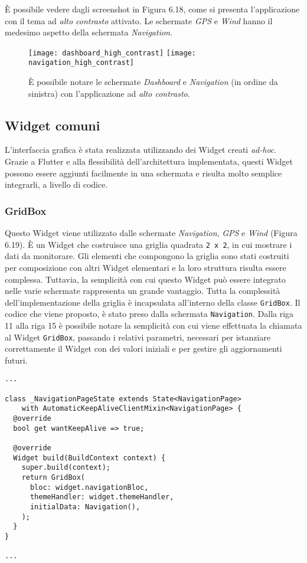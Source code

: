 È possibile vedere dagli screenshot in Figura 6.18, come si presenta l'applicazione con il tema ad \textit{alto contrasto} attivato. Le schermate \textit{GPS} e \textit{Wind} hanno il medesimo aspetto della schermata \textit{Navigation}.
\begin{figure}[htp]
	\centering
	\texttt{[image: dashboard\_high\_contrast]}
	\texttt{[image: navigation\_high\_contrast]}
	\caption[Screenshot - Dashboard e Navigation con tema ad alto contrasto]{È possibile notare le schermate \textit{Dashboard} e \textit{Navigation} (in ordine da sinistra) con l'applicazione ad \textit{alto contrasto}.}\label{xyz}
\end{figure}

\newpage

\subsection{Widget comuni}
L'interfaccia grafica è stata realizzata utilizzando dei Widget creati \textit{ad-hoc}. Grazie a Flutter e alla flessibilità dell'architettura implementata, questi Widget possono essere aggiunti facilmente in una schermata e risulta molto semplice integrarli, a livello di codice.

\subsubsection{GridBox}
Questo Widget viene utilizzato dalle schermate \textit{Navigation}, \textit{GPS} e \textit{Wind} (Figura 6.19). È un Widget che costruisce una griglia quadrata \verb|2 x 2|, in cui mostrare i dati da monitorare. Gli elementi che compongono la griglia sono stati costruiti per composizione con altri Widget elementari e la loro struttura risulta essere complessa. Tuttavia, la semplicità con cui questo Widget può essere integrato nelle varie schermate rappresenta un grande vantaggio. Tutta la complessità dell'implementazione della griglia è incapsulata all'interno della classe \verb|GridBox|.
Il codice che viene proposto, è stato preso dalla schermata \verb|Navigation|. Dalla riga 11 alla riga 15 è possibile notare la semplicità con cui viene effettuata la chiamata al Widget \verb|GridBox|, passando i relativi parametri, necessari per istanziare correttamente il Widget con dei valori iniziali e per gestire gli aggiornamenti futuri.

\begin{lstlisting}
...

class _NavigationPageState extends State<NavigationPage>
    with AutomaticKeepAliveClientMixin<NavigationPage> {
  @override
  bool get wantKeepAlive => true;

  @override
  Widget build(BuildContext context) {
    super.build(context);
    return GridBox(
      bloc: widget.navigationBloc,
      themeHandler: widget.themeHandler,
      initialData: Navigation(),
    );
  }
}

...
\end{lstlisting}

